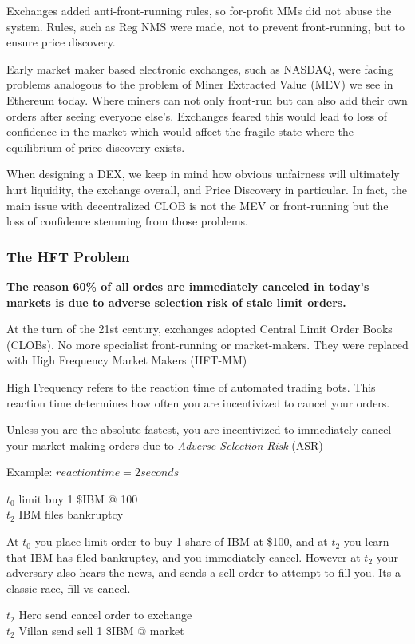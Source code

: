 \documentclass[12pt]{article}
\begin{document}
Exchanges added anti-front-running rules, so for-profit MMs did not abuse the system. Rules, such as Reg NMS were made, not to prevent front-running, but to ensure price discovery.

Early market maker based electronic exchanges, such as NASDAQ, were facing problems analogous to the problem of Miner Extracted Value (MEV) we see in Ethereum today. Where miners can not only front-run but can also add their own orders after seeing everyone else's. Exchanges feared this would lead to loss of confidence in the market which would affect the fragile state where the equilibrium of price discovery exists. 

When designing a DEX, we keep in mind how obvious unfairness will ultimately hurt liquidity, the exchange overall, and Price Discovery in particular. In fact, the main issue with decentralized CLOB is not the MEV or front-running but the loss of confidence stemming from those problems.  


\subsubsection*{The HFT Problem}
\textbf{The reason 60\% of all ordes are immediately canceled in today's markets is due to adverse selection risk of stale limit orders.} 

At the turn of the 21st century, exchanges adopted  Central Limit Order Books (CLOBs). No more specialist front-running or market-makers. They were replaced with High Frequency Market Makers (HFT-MM) 

High Frequency refers to the reaction time of automated trading bots. This reaction time determines how often you are incentivized to cancel your orders. 

Unless you are the absolute fastest, you are incentivized to immediately cancel your market making orders due to \emph{Adverse Selection Risk} (ASR)

Example: \( reaction time = 2 seconds \) 

$t_0$ limit buy 1 \$IBM @ 100 \\
$t_2$ IBM files bankruptcy 

At $t_0$ you place limit order to buy 1 share of IBM at \$100, and at $t_2$ you learn that IBM has filed bankruptcy, and you immediately cancel. However at $t_2$ your adversary also hears the news, and sends a sell order to attempt to fill you. Its a classic race, fill vs cancel.

$t_2$ Hero send cancel order to exchange  \\
$t_2$ Villan send sell 1 \$IBM @ market  
\end{document}
